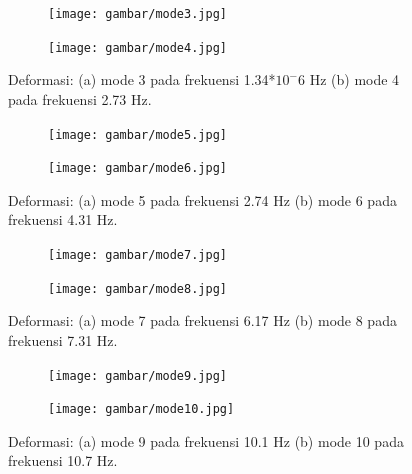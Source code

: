 \begin{figure}[H]
	\begin{subfigure}{0.49\textwidth}
		\centering
		\texttt{[image: gambar/mode3.jpg]}
		\caption{}
		\label{fig:mode3}
	\end{subfigure}
	\centering
	\begin{subfigure}{0.49\textwidth}
		\centering
		\texttt{[image: gambar/mode4.jpg]}
		\caption{}
		\label{fig:mode4}
	\end{subfigure}
	\caption{Deformasi: (a) mode 3 pada frekuensi 1.34*$10^-6$ Hz (b) mode 4 pada frekuensi 2.73 Hz.}
\end{figure}

\begin{figure}[H]
	\begin{subfigure}{0.49\textwidth}
		\centering
		\texttt{[image: gambar/mode5.jpg]}
		\caption{}
		\label{fig:mode5}
	\end{subfigure}
	\centering
	\begin{subfigure}{0.49\textwidth}
		\centering
		\texttt{[image: gambar/mode6.jpg]}
		\caption{}
		\label{fig:mode6}
	\end{subfigure}
	\caption{Deformasi: (a) mode 5 pada frekuensi 2.74 Hz (b) mode 6 pada frekuensi 4.31 Hz.}
\end{figure}

\begin{figure}[H]
	\begin{subfigure}{0.49\textwidth}
		\centering
		\texttt{[image: gambar/mode7.jpg]}
		\caption{}
		\label{fig:mode7}
	\end{subfigure}
	\centering
	\begin{subfigure}{0.49\textwidth}
		\centering
		\texttt{[image: gambar/mode8.jpg]}
		\caption{}
		\label{fig:mode8}
	\end{subfigure}
	\caption{Deformasi: (a) mode 7 pada frekuensi 6.17 Hz (b) mode 8 pada frekuensi 7.31 Hz.}
\end{figure}

\begin{figure}[H]
	\begin{subfigure}{0.49\textwidth}
		\centering
		\texttt{[image: gambar/mode9.jpg]}
		\caption{}
		\label{fig:mode9}
	\end{subfigure}
	\centering
	\begin{subfigure}{0.49\textwidth}
		\centering
		\texttt{[image: gambar/mode10.jpg]}
		\caption{}
		\label{fig:mode10}
	\end{subfigure}
	\caption{Deformasi: (a) mode 9 pada frekuensi 10.1 Hz (b) mode 10 pada frekuensi 10.7 Hz.}
	\label{fig:modeshape10}
\end{figure}

